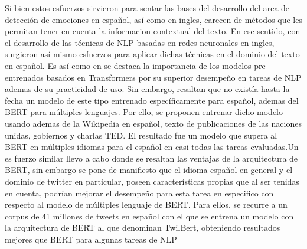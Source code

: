 Si bien estos esfuerzos sirvieron para sentar las bases del desarrollo del area de detección de emociones en español, así como en ingles, carecen de métodos que les permitan tener en cuenta la informacion contextual del texto. En ese sentido, con el desarrollo de las técnicas de NLP basadas en redes neuronales en ingles, surgieron así mismo esfuerzos para aplicar dichas técnicas en el dominio del texto en español. Es así como en \cite{canete2020spanish} se destaca la importancia de los modelos pre entrenados basados en Transformers por su superior desempeño en tareas de NLP ademas de su practicidad de uso. Sin embargo, resaltan que no existía hasta la fecha un modelo de este tipo entrenado específicamente para español, ademas del BERT para múltiples lenguajes. Por ello, se proponen entrenar dicho modelo usando ademas de la Wikipedia en español, texto de publicaciones de las naciones unidas, gobiernos y charlas TED. El resultado fue un modelo que supera al BERT en múltiples idiomas para el español en casi todas las tareas evaluadas.Un es fuerzo similar llevo a cabo \cite{gonzalez2021twilbert} donde se resaltan las ventajas de la arquitectura de BERT, sin embargo se pone de manifiesto que el idioma español en general y el dominio de twitter en particular, poseen características propias que al ser tenidas en cuenta, podrían mejorar el desempeño para esta tarea en especifico con respecto al modelo de múltiples lenguaje de BERT. Para ellos, se recurre a un corpus de 41 millones de tweets en español con el que se entrena un modelo con la arquitectura de BERT al que denominan TwilBert, obteniendo resultados mejores que BERT para algunas tareas de NLP







